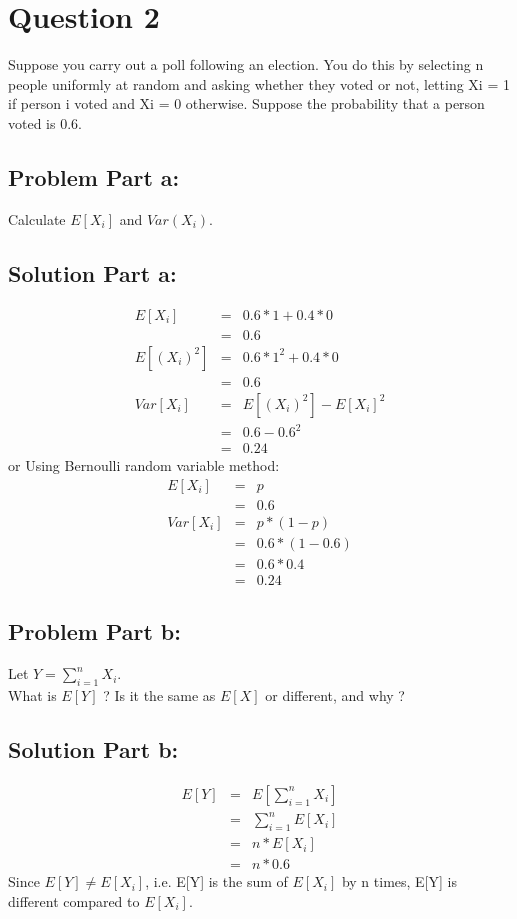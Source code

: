 \documentclass[12pt]{article}%
\begin{document}
\newpage
\section*{Question 2}
Suppose you carry out a poll following an election. You do this by selecting n people uniformly at random and asking whether they voted or not, letting Xi = 1 if person i voted and Xi = 0 otherwise. Suppose the probability that a person voted is 0.6.
\subsection*{Problem Part a:}
Calculate $E[X_i]$ and $Var(X_i)$. \\ 
\subsection*{Solution Part a:}
\begin{eqnarray*}
	E[X_i] & = & 0.6 * 1 + 0.4 * 0 \\
		   & = & 0.6 \\
	E[(X_i)^2] & = & 0.6 * 1^2 + 0.4 * 0 \\
			   & = & 0.6 \\
    Var[X_i] & = & E[(X_i)^2] - E[X_i]^2 \\
    		 & = & 0.6 - 0.6^2 \\
    		 & = & 0.24
\end{eqnarray*}
or Using Bernoulli random variable method:
\begin{eqnarray*}
	E[X_i] & = & p \\
		   & = & 0.6 \\
    Var[X_i] & = & p * (1-p) \\
    		 & = & 0.6 * (1-0.6) \\
    		 & = & 0.6 * 0.4 \\
    		 & = & 0.24
\end{eqnarray*}
\subsection*{Problem Part b:}
Let $Y = \sum_{i=1}^{n} X_i$. \\
What is $E[Y]$ ? Is it the same as $E[X]$ or different, and why ?
\subsection*{Solution Part b:}
\begin{eqnarray*}
E[Y] & = & E[\sum_{i=1}^{n} X_i] \\
	 & = & \sum_{i=1}^{n} E[X_i] \\
	 & = & n * E[X_i] \\
	 & = & n * 0.6
\end{eqnarray*}
Since $E[Y] \neq E[X_i]$, i.e. E[Y] is the sum of $E[X_i]$ by n times, E[Y] is different compared to $E[X_i]$.
\end{document}
